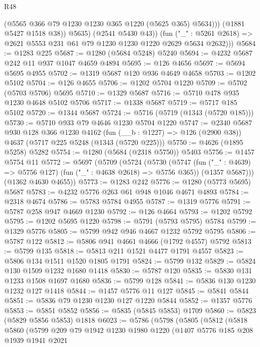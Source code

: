 \begin{lexlean}{R48}
\begin{coremodule}
                  (@5565 @366 @79 @1230 @1230 @365 @1220 (@5625 @365) @5634)))
              (@1881 @5427 @1518 @38))
            @5635)
          (@2541 @5430 @43))
        (fun ("_" : @5261 @2618) => @2621 @5553 @231 @61 @79 @1230 @1230 @1220 @2629 @5634 @2632)))
@5684 := @1283 @225
@5687 := @1280 (@5684 @5248) @5240
@5694 := @4232 @5687 @242 @11 @937 @1047 @4659 @4894
@5695 := @126 @4656
@5697 := @5694 @5695 @4955
@5702 := @1319 @5687 @120 @936 @4649 @4658
@5703 := @1202 @5102
@5704 := @126 @4655
@5706 := @1202 @5704 @1220
@5709 := @5702 (@5703 @5706) @5695
@5710 := @1329 @5687
@5716 := @5710 @478 @935 @1230 @4648 @5102 @5706
@5717 := @1338 @5687
@5719 := @5717 @185 @5102
@5720 := @1344 @5687
@5724 := @5716 (@5719 (@1343 (@5720 @185)))
@5730 := @5710 @933 @79 @4646 @1230 @5704 @1220
@5747 := @2340
    @5687
    @930
    @128
    @366
    @1230
    @4162
    (fun (__b : @1227) => @126 (@2900 @38))
    @4637
    (@5717 @225 @5248 (@1343 (@5720 @225)))
@5750 := @4626 (@1895 @5258) @5282
@5754 := @1280 (@5684 (@2318 @5750)) @5403
@5756 := @1457 @5754 @11
@5772 := @5697
    (@5709
      (@5724
        (@5730
          (@5747 (fun ("_" : @4639) => @5756 @127) (fun ("_" : @4638 @2618) => @5756 @365))
          (@1357 @5687)))
      (@1362 @4630 @4655))
@5773 := @1283 @242
@5776 := @1280 (@5773 @5695) @5687
@5783 := @4232 @5776 @263 @61 @948 @1046 @4671 @4893
@5784 := @2318 @4674
@5786 := @5783 @5784 @4955
@5787 := @1319 @5776
@5791 := @5787 @258 @947 @4669 @1230
@5792 := @126 @4664
@5793 := @1202 @5792
@5795 := @1202 @5695 @1220
@5798 := @5791 (@5793 @5795) @5784
@5799 := @1329 @5776
@5805 := @5799 @942 @946 @4667 @1232 @5792 @5795
@5806 := @5787 @122
@5812 := @5806 @941 @4661 @4666 (@1792 @4557) @5792
@5813 := @5799 @135
@5818 := @5813 @211 @1521 @4477 @1791 @4557
@5823 := @5806 @134 @1511 @1520 @1805 @1791
@5824 := @5799 @132
@5829 := @5824 @130 @1509 @1232 @1680 @1418
@5830 := @5787 @120
@5835 := @5830 @131 @1233 @1508 @1697 @1680
@5836 := @5799 @128
@5841 := @5836 @130 @1230 @1232 @127 @1418
@5844 := @1457 @5776 @11 @127
@5845 := @5841 @5844
@5851 := @5836 @79 @1230 @1230 @127 @1220 @5844
@5852 := @1357 @5776
@5853 := @5851 @5852
@5856 := @5835 (@5845 @5853) @1709
@5860 := @5823 (@5829 @5856 @5853) @1818
@6023 := @5786
    (@5798
      (@5805
        (@5812
          (@5818
            @5860
            (@5799
              @209
              @79
              @1942
              @1230
              @1980
              @1220
              (@1407
                @5776
                @185
                @208
                @1939
                @1941
                @2021

\end{coremodule}
\end{lexlean}
